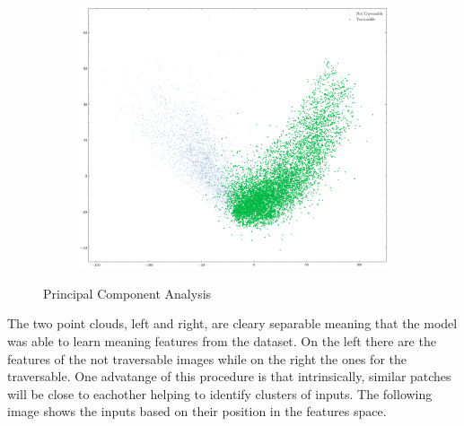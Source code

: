 \documentclass[../document.tex]{subfiles}
\begin{document}
\begin{figure}[H]
\begin{subfigure}[b]{0.48\textwidth}
        \includegraphics[width=\linewidth]{../img/5/pca/pca-1.png}
    \end{subfigure}
\caption{Principal Component Analysis}
\end{figure}
The two point clouds, left and right, are cleary separable meaning that the model was able to learn meaning features from the dataset. On the left there are the features of the not traversable images while on the right the ones for the traversable. One advatange of this procedure is that intrinsically, similar patches will be close to eachother helping to identify clusters of inputs. The following image shows the inputs based on their position in the features space.
\end{document}
